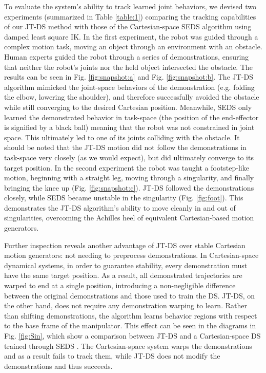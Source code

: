 \documentclass[letterpaper, 10 pt, conference,fleqn]{ieeeconf}
\begin{document}
To evaluate the system's ability to track learned joint behaviors, we devised two experiments (summarized in Table \ref{table:1}) comparing the tracking capabilities of our JT-DS method with those of the Cartesian-space SEDS \cite{khansari2011learning} algorithm using damped least square IK. In the first experiment, the robot was guided through a complex motion task, moving an object through an environment with an obstacle. 
Human experts guided the robot through a series of demonstrations, ensuring that neither the robot's joints nor the held object intersected the obstacle. The results can be seen in Fig. \ref{fig:snapshot:a} and Fig. \ref{fig:snapshot:b}. The JT-DS algorithm mimicked the joint-space behaviors of the demonstration (e.g. folding the elbow, lowering the shoulder), and therefore successfully avoided the obstacle while still converging to the desired Cartesian position. Meanwhile, SEDS only learned the demonstrated behavior in task-space (the position of the end-effector is signified by a black ball) meaning that the robot was not constrained in joint space. This ultimately led to one of its joints colliding with the obstacle. It should be noted that the JT-DS motion did not follow the demonstrations in task-space very closely (as we would expect), but did ultimately converge to its target position.
In the second experiment the robot was taught a footstep-like motion, beginning with a straight leg, moving through a singularity, and finally bringing the knee up (Fig. \ref{fig:snapshot:c}). JT-DS followed the demonstrations closely, while SEDS became unstable in the singularity (Fig. \ref{fig:foot}). This demonstrates the JT-DS algorithm's ability to move cleanly in and out of singularities, overcoming the Achilles heel of equivalent Cartesian-based motion generators.

Further inspection reveals another advantage of JT-DS over stable Cartesian motion generators: not needing to preprocess demonstrations. In Cartesian-space dynamical systems, in order to guarantee stability, every demonstration must have the same target position. As a result, all demonstrated trajectories are warped to end at a single position, introducing a non-negligible difference between the original demonstrations and those used to train the DS. JT-DS, on the other hand, does not require any demonstration warping to learn. Rather than shifting demonstrations, the algorithm learns behavior regions with respect to the base frame of the manipulator. This effect can be seen in the diagrams in Fig. \ref{fig:Sin}, which show a comparison between JT-DS and a Cartesian-space DS trained through SEDS \cite{khansari2011learning}. The Cartesian-space system warps the demonstrations and as a result fails to track them, while JT-DS does not modify the demonstrations and thus succeeds.
\end{document}
